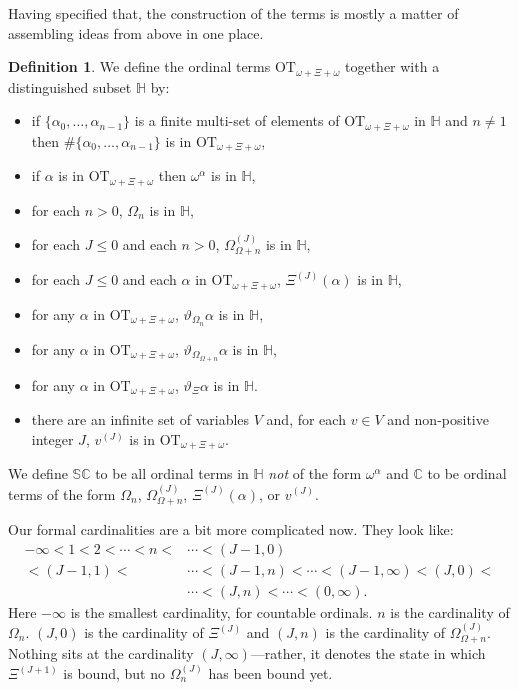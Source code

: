 \documentclass[11pt]{amsart}
\theoremstyle{definition}
\newtheorem{definition}[theorem]{Definition}
\begin{document}
Having specified that, the construction of the terms is mostly a matter of assembling ideas from above in one place.
\begin{definition}
  We define the ordinal terms $\mathrm{OT}_{\omega+\Xi+\omega}$ together with a distinguished subset $\mathbb{H}$ by:
  \begin{itemize}
  \item if $\{\alpha_0,\ldots,\alpha_{n-1}\}$ is a finite multi-set of elements of $\mathrm{OT}_{\omega+\Xi+\omega}$ in $\mathbb{H}$ and $n\neq 1$ then $\#\{\alpha_0,\ldots,\alpha_{n-1}\}$ is in $\mathrm{OT}_{\omega+\Xi+\omega}$,
  \item if $\alpha$ is in $\mathrm{OT}_{\omega+\Xi+\omega}$ then $\omega^\alpha$ is in $\mathbb{H}$,
  \item for each $n>0$, $\Omega_n$ is in $\mathbb{H}$,
  \item for each $J\leq 0$ and each $n>0$, $\Omega^{(J)}_{\Omega+n}$ is in $\mathbb{H}$,
  \item for each $J\leq 0$ and each $\alpha$ in $\mathrm{OT}_{\omega+\Xi+\omega}$, $\Xi^{(J)}(\alpha)$ is in $\mathbb{H}$,
  \item for any $\alpha$ in $\mathrm{OT}_{\omega+\Xi+\omega}$, $\vartheta_{\Omega_n}\alpha$ is in $\mathbb{H}$,
  \item for any $\alpha$ in $\mathrm{OT}_{\omega+\Xi+\omega}$, $\vartheta_{\Omega_{\Omega+n}}\alpha$ is in $\mathbb{H}$,
  \item for any $\alpha$ in $\mathrm{OT}_{\omega+\Xi+\omega}$, $\vartheta_\Xi\alpha$ is in $\mathbb{H}$.
  \item there are an infinite set of variables $V$ and, for each $v\in V$ and non-positive integer $J$, $v^{(J)}$ is in $\mathrm{OT}_{\omega+\Xi+\omega}$.
  \end{itemize}

  We define $\mathbb{SC}$ to be all ordinal terms in $\mathbb{H}$ \emph{not} of the form $\omega^\alpha$ and $\mathbb{C}$ to be ordinal terms of the form $\Omega_n$, $\Omega^{(J)}_{\Omega+n}$, $\Xi^{(J)}(\alpha)$, or $v^{(J)}$.
\end{definition}

Our formal cardinalities are a bit more complicated now. They look like:
\begin{align*}
  -\infty<1<2<\cdots<n<&\cdots<(J-1,0)\\
                <(J-1,1)<&\cdots<(J-1,n)<\cdots<(J-1,\infty)<(J,0)<\\&\cdots<(J,n)<\cdots<(0,\infty).\end{align*}
Here $-\infty$ is the smallest cardinality, for countable ordinals. $n$ is the cardinality of $\Omega_n$. $(J,0)$ is the cardinality of $\Xi^{(J)}$ and $(J,n)$ is the cardinality of $\Omega^{(J)}_{\Omega+n}$. Nothing sits at the cardinality $(J,\infty)$---rather, it denotes the state in which $\Xi^{(J+1)}$ is bound, but no $\Omega_n^{(J)}$ has been bound yet.
\end{document}
